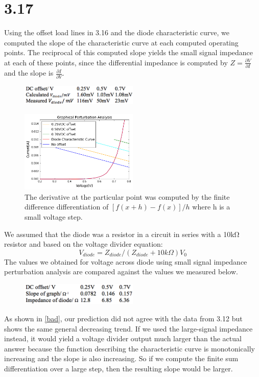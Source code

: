 \documentclass[authoryear, 12pt,5p, times]{elsarticle}
\begin{document}
\section*{3.17}
Using the offset load lines in 3.16 and the diode characteristic curve, we computed the slope of the characteristic curve at each computed operating points. The reciprocal of this computed slope yields the small signal impedance at each of these points, since the differential impedance is computed by $Z=\frac{\partial V}{\partial I}$ and the slope is $\frac{\partial I}{\partial V}$.  
\begin{figure}
\center
\includegraphics[width=0.5\textwidth]{figure/table1}
\end{figure}
\begin{figure}[h!]
\center
\includegraphics[width=0.5\textwidth]{figure/doris}
\caption{The derivative at the particular point was computed by the finite difference differentiation of $[f(x+h)-f(x)]/h$ where h is a small voltage step. }
\label{slope}
\end{figure}
We assumed that the diode was a resistor in a circuit in series with a 10kΩ resistor and based on the voltage divider equation:
\begin{equation}
V_{diode}=  Z_{diode}/(Z_{diode}+10k\Omega)  V_0
\end{equation}
The values we obtained for voltage across diode using small signal impedance perturbation analysis are compared against the values we measured below.
\begin{figure}
\center
\includegraphics[width=0.5\textwidth]{figure/table2}
\end{figure}
\par  As shown in \ref{bad}, our prediction did not agree with the data from 3.12  but shows the same general decreasing trend. If we used the large-signal impedance instead, it would yield a voltage divider output much larger than the actual answer because the function describing the characteristic curve is monotonically increasing and the slope is also increasing. So if we compute the finite sum differentiation over a large step, then the resulting slope would be larger.
\end{document}
